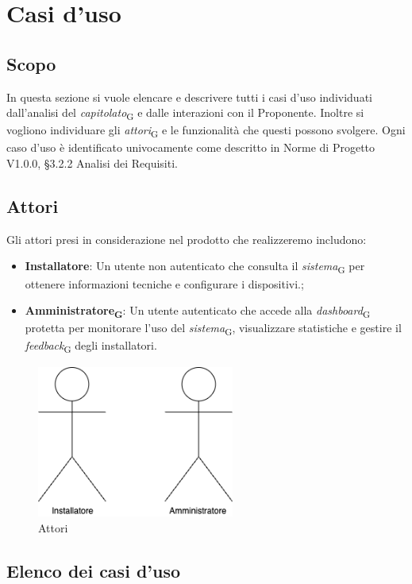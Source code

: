 \section{Casi d'uso}
\subsection{Scopo}
In questa sezione si vuole elencare e descrivere tutti i casi d'uso individuati dall'analisi del \textit{capitolato}\textsubscript{G} e dalle interazioni con il Proponente. Inoltre si vogliono individuare gli \textit{attori}\textsubscript{G} e le funzionalità che questi possono svolgere. Ogni caso d'uso è identificato univocamente come descritto in Norme di Progetto V1.0.0,  §3.2.2 Analisi dei Requisiti.

\subsection{Attori}
Gli attori presi in considerazione nel prodotto che realizzeremo includono:
\begin{itemize}
    \item \textbf{Installatore}: Un utente non autenticato che consulta il \textit{sistema}\textsubscript{G} per ottenere informazioni tecniche e configurare i dispositivi.; 
    \item \textbf{Amministratore\textsubscript{G}}: Un utente autenticato che accede alla \textit{dashboard}\textsubscript{G} protetta per monitorare l’uso del \textit{sistema}\textsubscript{G}, visualizzare statistiche e gestire il \textit{feedback}\textsubscript{G} degli installatori.
\end{itemize}
\begin{figure}[H]
\centering
\includegraphics[height=5cm]{contents/casi_duso/png/attori.png}
\caption{Attori}
\end{figure}

\subsection{Elenco dei casi d'uso}

